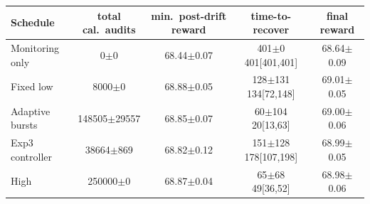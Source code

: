 \begin{tabular}{lcccc}
\toprule
Schedule & total cal.\ audits & min.\ post-drift reward & time-to-recover & final reward\\
\midrule
Monitoring only & 0$\pm$0 & 68.44$\pm$0.07 & \shortstack{401$\pm$0\\401[401,401]} & 68.64$\pm$0.09\\
Fixed low & 8000$\pm$0 & 68.88$\pm$0.05 & \shortstack{128$\pm$131\\134[72,148]} & 69.01$\pm$0.05\\
Adaptive bursts & 148505$\pm$29557 & 68.85$\pm$0.07 & \shortstack{60$\pm$104\\20[13,63]} & 69.00$\pm$0.06\\
Exp3 controller & 38664$\pm$869 & 68.82$\pm$0.12 & \shortstack{151$\pm$128\\178[107,198]} & 68.99$\pm$0.05\\
High & 250000$\pm$0 & 68.87$\pm$0.04 & \shortstack{65$\pm$68\\49[36,52]} & 68.98$\pm$0.06\\
\bottomrule
\end{tabular}
